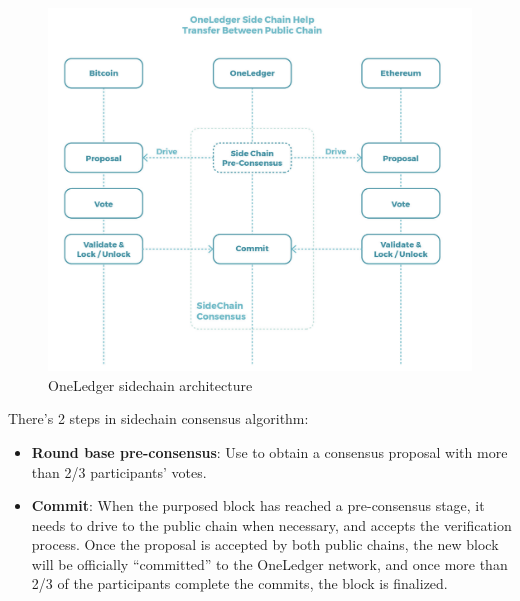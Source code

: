        \begin{figure}[H]
        \includegraphics[width=1\textwidth]{./figures/oneledger.png}
        \centering
        \caption{{OneLedger sidechain architecture}\protect\footnotemark}
        \centering
        \label{fig:oneledger}
        
        \end{figure}
\noindent There's 2 steps in sidechain consensus algorithm:
\begin{itemize}
    \item \textbf{Round base pre-consensus}: Use to obtain a consensus proposal with more than 2/3 participants' votes.
    \item \textbf{Commit}: When the purposed block has reached a pre-consensus stage, it needs to drive to the public chain when necessary, and accepts the verification process. Once the proposal is accepted by both public chains, the new block will be officially “committed” to the OneLedger network, and once more than 2/3 of the participants complete the commits, the block is finalized. 
\end{itemize}